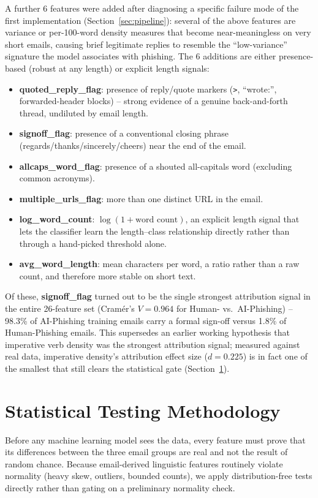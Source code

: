 \documentclass[11pt]{article}
\begin{document}
A further 6 features were added after diagnosing a specific failure mode of the first
implementation (Section~\ref{sec:pipeline}): several of the above features are variance or
per-100-word density measures that become near-meaningless on very short emails, causing brief
legitimate replies to resemble the ``low-variance'' signature the model associates with phishing.
The 6 additions are either presence-based (robust at any length) or explicit length signals:
\begin{itemize}
    \item \textbf{quoted\_reply\_flag}: presence of reply/quote markers (\texttt{>}, ``wrote:'',
      forwarded-header blocks) -- strong evidence of a genuine back-and-forth thread, undiluted by
      email length.
    \item \textbf{signoff\_flag}: presence of a conventional closing phrase
      (regards/thanks/sincerely/cheers) near the end of the email.
    \item \textbf{allcaps\_word\_flag}: presence of a shouted all-capitals word (excluding common
      acronyms).
    \item \textbf{multiple\_urls\_flag}: more than one distinct URL in the email.
    \item \textbf{log\_word\_count}: $\log(1+\text{word count})$, an explicit length signal that
      lets the classifier learn the length--class relationship directly rather than through a
      hand-picked threshold alone.
    \item \textbf{avg\_word\_length}: mean characters per word, a ratio rather than a raw count,
      and therefore more stable on short text.
\end{itemize}
Of these, \textbf{signoff\_flag} turned out to be the single strongest attribution signal in the
entire 26-feature set (Cram\'er's $V = 0.964$ for Human- vs.\ AI-Phishing) -- 98.3\% of AI-Phishing
training emails carry a formal sign-off versus 1.8\% of Human-Phishing emails. This supersedes an
earlier working hypothesis that imperative verb density was the strongest attribution signal; measured
against real data, imperative density's attribution effect size ($d = 0.225$) is in fact one of
the smallest that still clears the statistical gate (Section~\ref{sec:testing}).

\section{Statistical Testing Methodology}
\label{sec:testing}
Before any machine learning model sees the data, every feature must prove that its differences
between the three email groups are real and not the result of random chance. Because
email-derived linguistic features routinely violate normality (heavy skew, outliers, bounded
counts), we apply distribution-free tests directly rather than gating on a preliminary normality
check.
\end{document}
